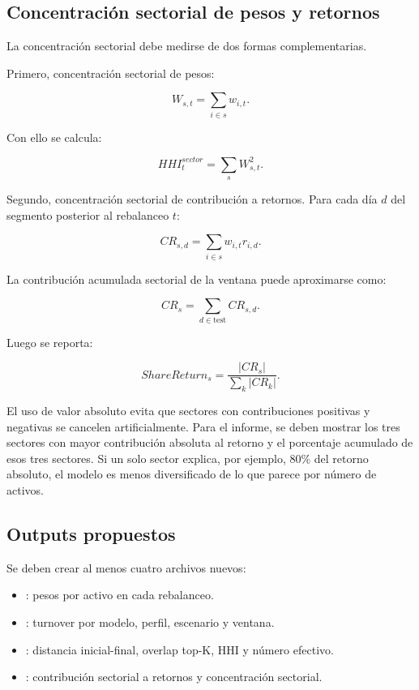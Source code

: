 \documentclass[11pt]{article}
\begin{document}
\subsection{Concentraci\'on sectorial de pesos y retornos}

La concentraci\'on sectorial debe medirse de dos formas complementarias.

Primero, concentraci\'on sectorial de pesos:

\[
W_{s,t} = \sum_{i \in s} w_{i,t}.
\]

Con ello se calcula:

\[
HHI^{sector}_t = \sum_s W_{s,t}^2.
\]

Segundo, concentraci\'on sectorial de contribuci\'on a retornos. Para cada d\'ia $d$ del segmento posterior al rebalanceo $t$:

\[
CR_{s,d} = \sum_{i \in s} w_{i,t} r_{i,d}.
\]

La contribuci\'on acumulada sectorial de la ventana puede aproximarse como:

\[
CR_s = \sum_{d \in \text{test}} CR_{s,d}.
\]

Luego se reporta:

\[
ShareReturn_s = \frac{|CR_s|}{\sum_k |CR_k|}.
\]

El uso de valor absoluto evita que sectores con contribuciones positivas y negativas se cancelen artificialmente. Para el informe, se deben mostrar los tres sectores con mayor contribuci\'on absoluta al retorno y el porcentaje acumulado de esos tres sectores. Si un solo sector explica, por ejemplo, 80\% del retorno absoluto, el modelo es menos diversificado de lo que parece por n\'umero de activos.

\subsection{Outputs propuestos}

Se deben crear al menos cuatro archivos nuevos:

\begin{itemize}
    \item {}: pesos por activo en cada rebalanceo.
    \item {}: turnover por modelo, perfil, escenario y ventana.
    \item {}: distancia inicial-final, overlap top-K, HHI y n\'umero efectivo.
    \item {}: contribuci\'on sectorial a retornos y concentraci\'on sectorial.
\end{itemize}
\end{document}

